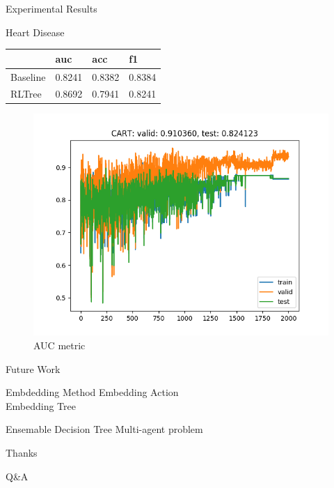 \documentclass{beamer}
\begin{document}
\begin{frame}{Experimental Results}
	\begin{block}{Heart Disease}
		\begin{table}[]
			\begin{tabular}{llll}
				\hline
				& auc    & acc    & f1     \\ \hline
				Baseline & 0.8241 & 0.8382 & 0.8384 \\
				RLTree   & 0.8692 & 0.7941 & 0.8241 \\ \hline
			\end{tabular}
		\end{table}
	\end{block}
	\begin{figure}{}
		\includegraphics[scale=0.4]{heart_auc_sample_curve}
		\caption{AUC metric}
	\end{figure}
\end{frame}


\begin{frame}{Future Work}
	\begin{block}{Embdedding Method}
		Embedding Action\\
		Embedding Tree
	\end{block}
	\begin{block}{Ensemable Decision Tree}
		Multi-agent problem
	\end{block}
\end{frame}

\begin{frame}[plain,c]
	
	\begin{center}
		\Huge Thanks
	\end{center}
	\begin{center}
		Q\&A
	\end{center}
	
\end{frame}
\end{document}
